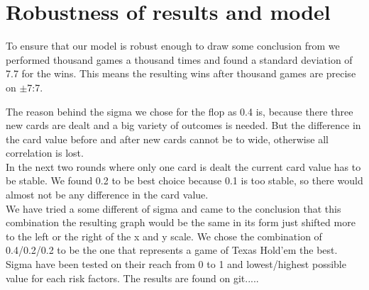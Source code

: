 \documentclass[11pt]{article}
\begin{document}
\section{Robustness of results and model}

 

To ensure that our model is robust enough to draw some conclusion from we performed thousand games a thousand times and found a standard deviation of 7.7 for the wins. This means the resulting wins after thousand games are precise on $\pm$7:7.\newline

 

The reason behind the sigma we chose for the flop as 0.4 is, because there three new cards are dealt and a big variety of outcomes is needed. But the difference in the card value before and after new cards cannot be to wide, otherwise all correlation is lost.\\

In the next two rounds where only one card is dealt the current card value has to be stable. We found 0.2 to be best choice because 0.1 is too stable, so there would almost not be any difference in the card value.\\

 

We have tried a some different of sigma and came to the conclusion that this combination the resulting graph would be the same in its form just shifted more to the left or the right of the x and y scale. We chose the combination of 0.4/0.2/0.2 to be the one that represents a game of Texas Hold'em the best. \\

Sigma have been tested on their reach from 0 to 1 and lowest/highest possible value for each risk factors. The results are found on git.....
\end{document}
